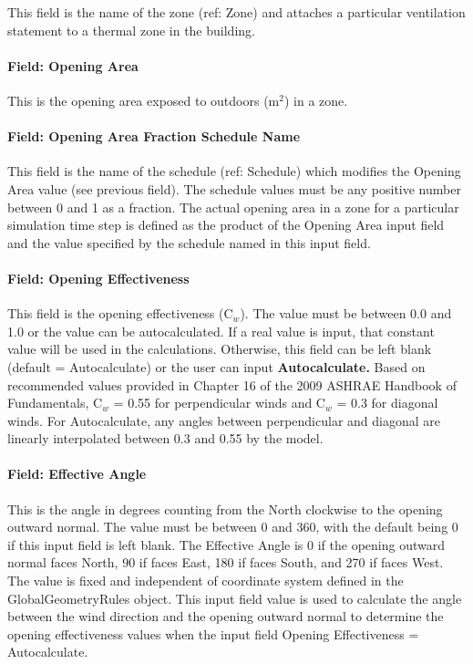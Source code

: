 This field is the name of the zone (ref: Zone) and attaches a particular ventilation statement to a thermal zone in the building.

\paragraph{Field: Opening Area}\label{field-opening-area}

This is the opening area exposed to outdoors (m\(^{2}\)) in a zone.

\paragraph{Field: Opening Area Fraction Schedule Name}\label{field-opening-area-fraction-schedule-name}

This field is the name of the schedule (ref: Schedule) which modifies the Opening Area value (see previous field). The schedule values must be any positive number between 0 and 1 as a fraction. The actual opening area in a zone for a particular simulation time step is defined as the product of the Opening Area input field and the value specified by the schedule named in this input field.

\paragraph{Field: Opening Effectiveness}\label{field-opening-effectiveness}

This field is the opening effectiveness (C\(_{w}\)). The value must be between 0.0 and 1.0 or the value can be autocalculated. If a real value is input, that constant value will be used in the calculations. Otherwise, this field can be left blank (default = Autocalculate) or the user can input \textbf{Autocalculate.} Based on recommended values provided in Chapter 16 of the 2009 ASHRAE Handbook of Fundamentals, C\(_{w}\) = 0.55 for perpendicular winds and C\(_{w}\) = 0.3 for diagonal winds. For Autocalculate, any angles between perpendicular and diagonal are linearly interpolated between 0.3 and 0.55 by the model.

\paragraph{Field: Effective Angle}\label{field-effective-angle}

This is the angle in degrees counting from the North clockwise to the opening outward normal. The value must be between 0 and 360, with the default being 0 if this input field is left blank. The Effective Angle is 0 if the opening outward normal faces North, 90 if faces East, 180 if faces South, and 270 if faces West. The value is fixed and independent of coordinate system defined in the GlobalGeometryRules object. This input field value is used to calculate the angle between the wind direction and the opening outward normal to determine the opening effectiveness values when the input field Opening Effectiveness = Autocalculate.

